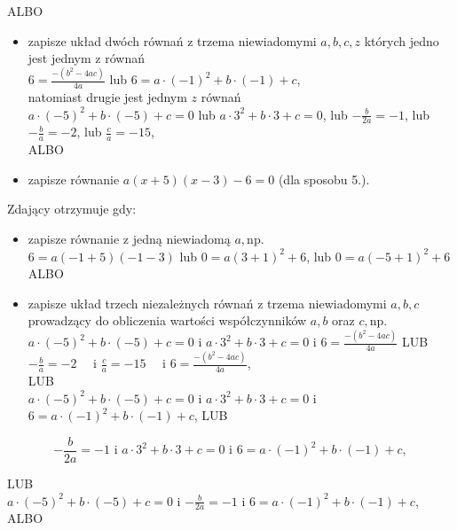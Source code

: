 \documentclass[10pt]{article}
\begin{document}
ALBO

\begin{itemize}
  \item zapisze układ dwóch równań z trzema niewiadomymi $a, b, c, z$ których jedno jest jednym z równań\\
$6=\frac{-\left(b^{2}-4 a c\right)}{4 a}$ lub $6=a \cdot(-1)^{2}+b \cdot(-1)+c$,\\
natomiast drugie jest jednym $z$ równań\\
$a \cdot(-5)^{2}+b \cdot(-5)+c=0$ lub $a \cdot 3^{2}+b \cdot 3+c=0$, lub $-\frac{b}{2 a}=-1$, lub $-\frac{b}{a}=-2$, lub $\frac{c}{a}=-15$,\\
ALBO
  \item zapisze równanie $a(x+5)(x-3)-6=0$ (dla sposobu 5.).
\end{itemize}

Zdający otrzymuje gdy:

\begin{itemize}
  \item zapisze równanie z jedną niewiadomą $a, \mathrm{np}$.\\
$6=a(-1+5)(-1-3)$ lub $0=a(3+1)^{2}+6$, lub $0=a(-5+1)^{2}+6$\\
ALBO
  \item zapisze układ trzech niezależnych równań z trzema niewiadomymi $a, b, c$ prowadzący do obliczenia wartości współczynników $a, b$ oraz $c, \mathrm{np}$.\\
$a \cdot(-5)^{2}+b \cdot(-5)+c=0$ i $a \cdot 3^{2}+b \cdot 3+c=0$ i $6=\frac{-\left(b^{2}-4 a c\right)}{4 a}$ LUB\\
$-\frac{b}{a}=-2 \quad$ i $\frac{c}{a}=-15 \quad$ i $6=\frac{-\left(b^{2}-4 a c\right)}{4 a}$,\\
LUB\\
$a \cdot(-5)^{2}+b \cdot(-5)+c=0$ i $a \cdot 3^{2}+b \cdot 3+c=0$ i $6=a \cdot(-1)^{2}+b \cdot(-1)+c$, LUB
\end{itemize}

$$
-\frac{b}{2 a}=-1 \text { i } a \cdot 3^{2}+b \cdot 3+c=0 \text { i } 6=a \cdot(-1)^{2}+b \cdot(-1)+c,
$$

LUB\\
$a \cdot(-5)^{2}+b \cdot(-5)+c=0$ i $-\frac{b}{2 a}=-1$ i $6=a \cdot(-1)^{2}+b \cdot(-1)+c$,\\
ALBO
\end{document}
